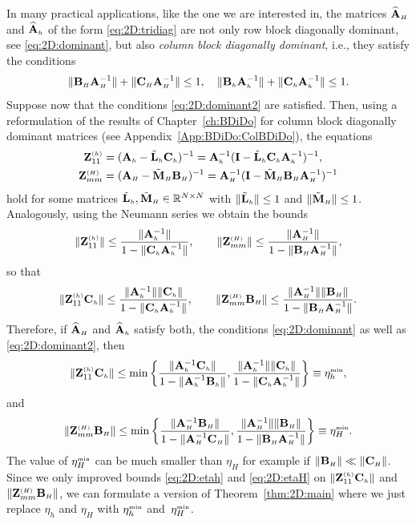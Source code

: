 In many practical applications, like the one we are interested in, the matrices
$\matAHhat$ and $\matAhhat$ of the form \eqref{eq:2D:tridiag} are not only row
block diagonally dominant, see \eqref{eq:2D:dominant}, but also \emph{column
block diagonally dominant}, i.e., they satisfy the conditions
\begin{equation}\label{eq:2D:dominant2}
 \|\matBH\matAH^{-1}\|+\|\matCH\matAH^{-1}\| \leq 1,\quad
 \|\matBh\matAh^{-1}\|+\|\matCh\matAh^{-1}\| \leq 1.
\end{equation}
Suppose now that the conditions \eqref{eq:2D:dominant2} are satisfied.
Then, using a reformulation of the results of Chapter~\ref{ch:BDiDo} for
column block diagonally dominant matrices (see Appendix~\ref{App:BDiDo:ColBDiDo}),
the equations
%
\begin{align*}
\Z_{11}^{\klein{(h)}} &= (\matAh-\tilde{\L}_{\klein{h}} \matCh)^{-1} =
\matAh^{-1}(\I-\tilde{\L}_{\klein{h}}\matCh \matAh^{-1})^{-1},\\
\Z_{mm}^{\klein{(H)}} &= (\matAH-\tilde{\M}_{\klein{H}} \matBH )^{-1}=
\matAH^{-1}(\I-\tilde{\M}_{\klein{H}}\matBH \matAH^{-1})^{-1}
\end{align*}
%
hold for some matrices $\tilde{\L}_{\klein{h}},
\tilde{\M}_{\klein{H}}\in\mathbb{R}^{N\times N}$
with $\|\tilde{\L}_{\klein{h}}\|\leq 1$ and $\|\tilde{\M}_{\klein{H}}\|\leq 1$.
Analogously, using the Neumann series we obtain the bounds
$$
\|\Z_{11}^{\klein{(h)}}\|	\leq	\frac{\|\matAh^{-1}\|}{1-\|\matCh\matAh^{-1}\|},\qquad
\|\Z_{mm}^{\klein{(H)}}\|	\leq	\frac{\|\matAH^{-1}\|}{1-\|\matBH\matAH^{-1}\|},
$$
so that
$$
\|\Z_{11}^{\klein{(h)}}\matCh\|\leq\frac{\|\matAh^{-1}\|\|\matCh\|}
{1-\|\matCh\matAh^{-1}\|},\qquad
\|\Z_{mm}^{\klein{(H)}}\matBH\|	\leq	\frac{\|\matAH^{-1}\| \|\matBH\|}
{1-\|\matBH\matAH^{-1}\|}.
$$
Therefore, if $\matAHhat$ and $\matAhhat$ satisfy both, the conditions
\eqref{eq:2D:dominant} as well as \eqref{eq:2D:dominant2}, then
\begin{equation}\label{eq:2D:Z11min}
\|\Z_{11}^{\klein{(h)}}\matCh\|\leq \min \left\{ \frac{\|\matAh^{-1}\matCh\|}
{1-\|\matAh^{-1}\matBh\|},  \frac{\|\matAh^{-1}\|\|\matCh\|}
{1-\|\matCh\matAh^{-1}\|} \right\} \equiv \eta_h^{\klein{\min}},
\end{equation}
and
\begin{equation}\label{eq:2D:Zmmmin}
\|\Z_{mm}^{\klein{(H)}}\matBH\|	\leq
\min \left\{\frac{\|\matAH^{-1}\matBH\|}{1-\|\matAH^{-1}\matCH\|},
\frac{\|\matAH^{-1}\| \|\matBH\|}{1-\|\matBH\matAH^{-1}\|}\right\} \equiv
\eta_H^{\klein{\min}}.
\end{equation}
The value of $\eta_H^{\klein{\min}}$ can be much smaller than $\eta_H$ for
example if $\|\matBH\|\ll \|\matCH\|$.
%
Since we only improved bounds \eqref{eq:2D:etah} and \eqref{eq:2D:etaH}
on $\|\Z_{11}^{\klein{(h)}}\matCh\|$ and $\|\Z_{mm}^{\klein{(H)}}\matBH\|$,
we can formulate a version of Theorem~\ref{thm:2D:main} where we just replace
$\eta_h$ and $\eta_H$ with $\eta_h^{\klein{\min}}$ and~$\eta_H^{\klein{\min}}$.

